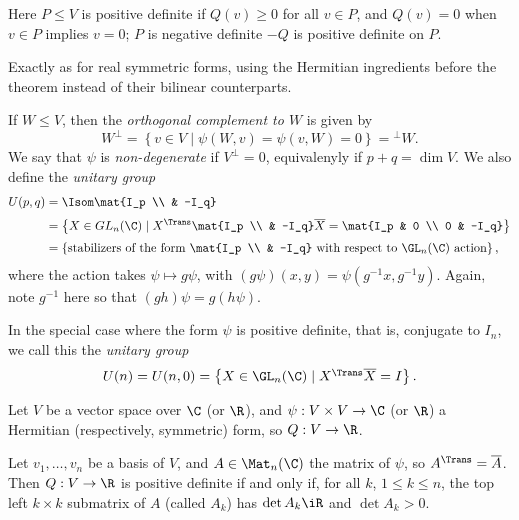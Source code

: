Here $P\leq V$ is positive definite if $Q(v)\geq 0$ for all $v\in P$, and $Q(v) = 0$ when $v \in P$ implies $v = 0$; $P$	is negative definite $-Q$ is positive definite on $P$.

\vspace{3pt}

\begin{proof*}
	Exactly as for real symmetric forms, using the Hermitian ingredients before the theorem instead of their bilinear counterparts. %
\end{proof*}

\begin{definition}
	If $W\leq V$, then the \emph{orthogonal complement to $W$} is given by %
	\begin{equation*}
		W^\perp = \left\{v\in V \mid \psi(W,v) = \psi(v,W) = 0 \right\} = {}^\perp W.
	\end{equation*}
	We say that $\psi$ is \emph{non-degenerate} if $V^\perp=0$, equivalenyly  if  $p+q=\dim V$. We also define the \emph{unitary group} %
	\begin{align*}
		U(p,q)
		&= \Isom\mat{I_p \\ & -I_q} \\[3pt]
		&= \left\{X\in GL_n(\C) \mid X^\Trans \mat{I_p \\ & -I_q} \overline{X} = \mat{I_p & 0 \\ 0 & -I_q}\right\} \\[3pt] %
		&= \left\{\text{stabilizers of the form } \mat{I_p \\ & -I_q} \text{ with respect to } \textstyle\GL_n(\C) \text{ action}\right\}, %
	\end{align*}
	where the action takes $\psi \mapsto g\psi$, with $(g\psi)(x,y) = \psi(g^{-1}x, g^{-1}y)$. Again, note $g^{-1}$ here so that $(gh)\psi = g(h\psi)$. %
	
	In the special case where the form $\psi$ is positive definite, that is, conjugate to $I_n$, we call this the \emph{unitary group} %
	\begin{equation*}
		U(n) = U(n,0) = \left\{X\in\textstyle\GL_n(\C) \mid X^\Trans \overline{X} = I \right\}. %
	\end{equation*}
\end{definition}

\begin{proposition}
	Let $V$ be a vector space over $\C$ (or $\R$), and $\psi:V\times V\to\C$ (or $\R$) a Hermitian (respectively, symmetric) form, so $Q:V\to\R$. %
	
	Let $v_1,\ldots,v_n$ be a basis of $V$, and $A\in\Mat_n(\C)$ the matrix of $\psi$, so $A^\Trans=\overline{A}$. Then $Q:V\to\R$ is positive definite if and only if, for all $k$, $1\leq k\leq n$, the top left $k\times k$ submatrix of $A$ (called $A_k$) has $\det A_k\iR$ and $\det A_k>0$. %
\end{proposition}


